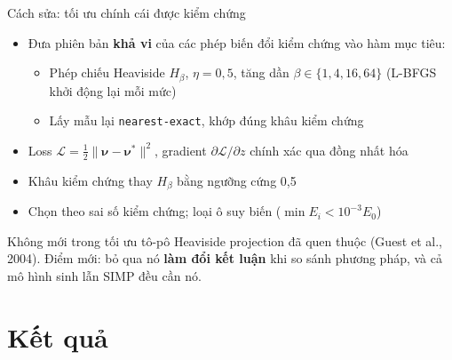 \documentclass[aspectratio=169,11pt]{beamer}
\begin{document}
\begin{frame}{Cách sửa: tối ưu chính cái được kiểm chứng}
  \begin{itemize}
    \item Đưa phiên bản \textbf{khả vi} của các phép biến đổi kiểm chứng
      vào hàm mục tiêu:
      \begin{itemize}
        \item Phép chiếu Heaviside $H_\beta$, $\eta=0{,}5$, tăng dần
          $\beta\in\{1,4,16,64\}$ (L-BFGS khởi động lại mỗi mức)
        \item Lấy mẫu lại \texttt{nearest-exact}, khớp đúng khâu kiểm chứng
      \end{itemize}
    \item Loss $\mathcal L=\tfrac12\lVert\boldsymbol\nu-\boldsymbol\nu^{*}\rVert^2$,
      gradient $\partial\mathcal L/\partial z$ chính xác qua đồng nhất hóa
    \item Khâu kiểm chứng thay $H_\beta$ bằng ngưỡng cứng 0,5
    \item Chọn theo sai số kiểm chứng; loại ô suy biến
      ($\min E_i<10^{-3}E_0$)
  \end{itemize}
  \vspace{3mm}
  \begin{alertblock}{Không mới trong tối ưu tô-pô}
    Heaviside projection đã quen thuộc (Guest et al., 2004). Điểm mới:
    bỏ qua nó \textbf{làm đổi kết luận} khi so sánh phương pháp, và cả mô hình
    sinh lẫn SIMP đều cần nó.
  \end{alertblock}
\end{frame}

\section{Kết quả}
\end{document}
